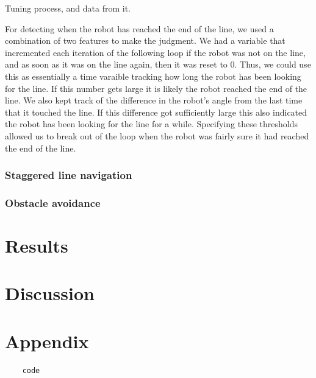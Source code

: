 \documentclass[12pt]{article}
\begin{document}
Tuning process, and data from it.

For detecting when the robot has reached the end of the line, we used a combination of two features to make the judgment. We had a variable that incremented each iteration of the following loop if the robot was not on the line, and as soon as it was on the line again, then it was reset to 0. Thus, we could use this as essentially a time varaible tracking how long the robot has been looking for the line. If this number gets large it is likely the robot reached the end of the line. We also kept track of the difference in the robot's angle from the last time that it touched the line. If this difference got sufficiently large this also indicated the robot has been looking for the line for a while. Specifying these thresholds allowed us to break out of the loop when the robot was fairly sure it had reached the end of the line.

\subsubsection{Staggered line navigation}

\subsubsection{Obstacle avoidance}

\section{Results}

\section{Discussion}


\section*{Appendix}

\begin{verbatim}
	code
\end{verbatim}
\end{document}
